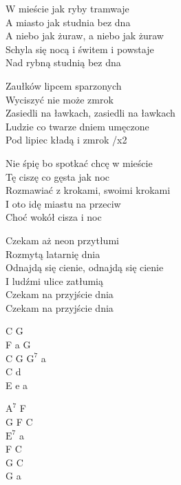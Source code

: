 \begin{text}
    W mieście jak ryby tramwaje\\
    A miasto jak studnia bez dna\\
    A niebo jak żuraw, a niebo jak żuraw\\
    Schyla się nocą i świtem i powstaje\\
    Nad rybną studnią bez dna

    Zaułków lipcem sparzonych\\
    Wyciszyć nie może zmrok\\
    Zasiedli na ławkach, zasiedli na ławkach\\
    Ludzie co twarze dniem umęczone\\
    Pod lipiec kładą i zmrok /x2

    Nie śpię bo spotkać chcę w mieście\\
    Tę ciszę co gęsta jak noc\\
    Rozmawiać z krokami, swoimi krokami\\
    I oto idę miastu na przeciw\\
    Choć wokół cisza i noc

    Czekam aż neon przytłumi\\
    Rozmytą latarnię dnia\\
    Odnajdą się cienie, odnajdą się cienie\\
    I ludźmi ulice zatłumią\\
    Czekam na przyjście dnia\\
    Czekam na przyjście dnia
\end{text}
\begin{chord}
    C G\\
    F a G\\
    C G $\mathrm{G^7}$ a\\
    C d\\
    E e a

    $\mathrm{A^7}$ F\\
    G F C\\
    $\mathrm{E^7}$ a\\
    F C\\
    G C\\
    G a
\end{chord}
